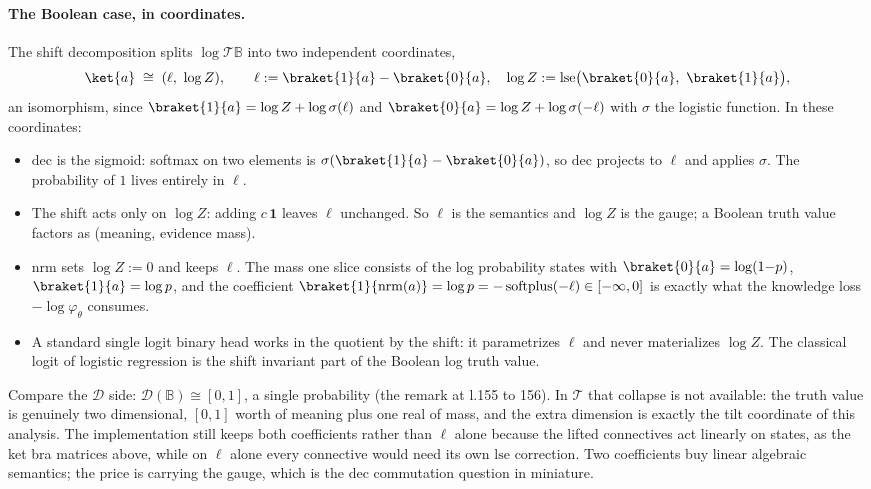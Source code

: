 \documentclass[anon]{../../journal-templates/NeSy26/nesy2026} %
\begin{document}
\paragraph{The Boolean case, in coordinates.} The shift decomposition
splits $\log\mathcal T\mathbb B$ into two independent coordinates,
\[
  \ket{a} \;\cong\; (\ell,\ \log Z),
  \qquad
  \ell := \braket{1}{a} - \braket{0}{a},
  \quad
  \log Z := \mathrm{lse}\bigl(\braket{0}{a},\ \braket{1}{a}\bigr),
\]
an isomorphism, since $\braket{1}{a} = \log Z + \log\sigma(\ell)$
and $\braket{0}{a} = \log Z + \log\sigma(-\ell)$ with $\sigma$ the
logistic function. In these coordinates:
\begin{itemize}
\item $\mathrm{dec}$ is the sigmoid: softmax on two elements is
  $\sigma(\braket{1}{a} - \braket{0}{a})$, so $\mathrm{dec}$
  projects to $\ell$ and applies $\sigma$. The probability of $1$ lives
  entirely in $\ell$.
\item The shift acts only on $\log Z$: adding $c\,\mathbf 1$ leaves
  $\ell$ unchanged. So $\ell$ is the semantics and $\log Z$ is the gauge;
  a Boolean truth value factors as (meaning, evidence mass).
\item $\mathrm{nrm}$ sets $\log Z := 0$ and keeps $\ell$. The mass one
  slice consists of the log probability states with
  $\braket{0}{a} = \log(1{-}p)$, $\braket{1}{a} = \log p$, and
  the coefficient
  $\braket{1}{\mathrm{nrm}(a)} = \log p = -\,\mathrm{softplus}(-\ell)
  \in [-\infty, 0]$ is exactly what the knowledge loss
  $-\log \varphi_\theta$ consumes.
\item A standard single logit binary head works in the quotient by the
  shift: it parametrizes $\ell$ and never materializes $\log Z$. The
  classical logit of logistic regression is the shift invariant part of
  the Boolean log truth value.
\end{itemize}
Compare the $\mathcal D$ side: $\mathcal D(\mathbb B) \cong [0,1]$, a
single probability (the remark at l.155 to 156). In $\mathcal T$ that
collapse is not available: the truth value is genuinely two dimensional,
$[0,1]$ worth of meaning plus one real of mass, and the extra dimension
is exactly the tilt coordinate of this analysis. The implementation still
keeps both coefficients rather than $\ell$ alone because the lifted
connectives act linearly on states, as the ket bra matrices above, while
on $\ell$ alone every connective would need its own $\mathrm{lse}$
correction. Two coefficients buy linear algebraic semantics; the price is
carrying the gauge, which is the dec commutation question in miniature.
\end{document}
